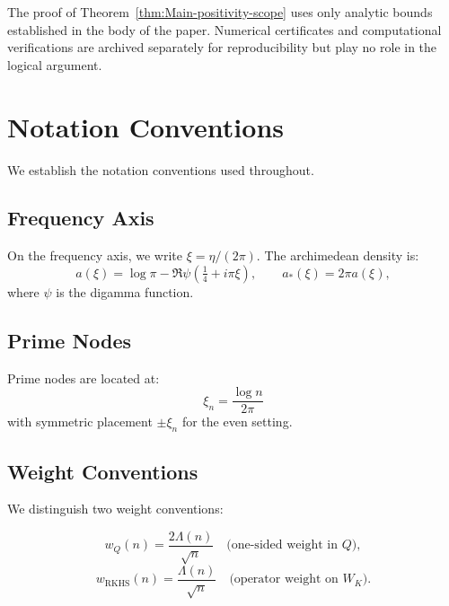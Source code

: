 \begin{remark}
The proof of Theorem~\ref{thm:Main-positivity-scope} uses only analytic bounds established in the body of the paper. Numerical certificates and computational verifications are archived separately for reproducibility but play no role in the logical argument.
\end{remark}

\section{Notation Conventions}\label{sec:notation-conventions}

We establish the notation conventions used throughout.

\subsection{Frequency Axis}

On the frequency axis, we write $\xi = \eta/(2\pi)$. The archimedean density is:
\begin{equation}
  a(\xi) = \log \pi - \Re \psi\left(\tfrac{1}{4} + i\pi\xi\right), \qquad a_*(\xi) = 2\pi a(\xi),
\end{equation}
where $\psi$ is the digamma function.

\subsection{Prime Nodes}

Prime nodes are located at:
\begin{equation}
  \xi_n = \frac{\log n}{2\pi}
\end{equation}
with symmetric placement $\pm \xi_n$ for the even setting.

\subsection{Weight Conventions}

We distinguish two weight conventions:

\begin{equation}
  w_Q(n) = \frac{2\Lambda(n)}{\sqrt{n}} \quad \text{(one-sided weight in $Q$)},
\end{equation}
\begin{equation}
  w_{\mathrm{RKHS}}(n) = \frac{\Lambda(n)}{\sqrt{n}} \quad \text{(operator weight on $W_K$)}.
\end{equation}

